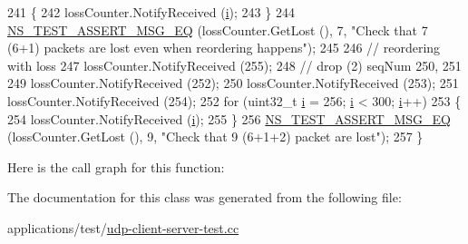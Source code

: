 \begin{DoxyCode}
241     \{
242       lossCounter.NotifyReceived (\hyperlink{bernuolliDistribution_8m_a6f6ccfcf58b31cb6412107d9d5281426}{i});
243     \}
244   \hyperlink{group__testing_ga2a9d78cffb3db8e867c35fff0b698cf5}{NS\_TEST\_ASSERT\_MSG\_EQ} (lossCounter.GetLost (), 7, \textcolor{stringliteral}{"Check that 7 (6+1) packets are
       lost even when reordering happens"});
245 
246   \textcolor{comment}{// reordering with loss}
247   lossCounter.NotifyReceived (255);
248   \textcolor{comment}{// drop (2) seqNum 250, 251}
249   lossCounter.NotifyReceived (252);
250   lossCounter.NotifyReceived (253);
251   lossCounter.NotifyReceived (254);
252   \textcolor{keywordflow}{for} (uint32\_t \hyperlink{bernuolliDistribution_8m_a6f6ccfcf58b31cb6412107d9d5281426}{i} = 256; \hyperlink{bernuolliDistribution_8m_a6f6ccfcf58b31cb6412107d9d5281426}{i} < 300; \hyperlink{bernuolliDistribution_8m_a6f6ccfcf58b31cb6412107d9d5281426}{i}++)
253     \{
254       lossCounter.NotifyReceived (\hyperlink{bernuolliDistribution_8m_a6f6ccfcf58b31cb6412107d9d5281426}{i});
255     \}
256   \hyperlink{group__testing_ga2a9d78cffb3db8e867c35fff0b698cf5}{NS\_TEST\_ASSERT\_MSG\_EQ} (lossCounter.GetLost (), 9, \textcolor{stringliteral}{"Check that 9 (6+1+2) packet are
       lost"});
257 \}
\end{DoxyCode}


Here is the call graph for this function\+:




The documentation for this class was generated from the following file\+:\begin{DoxyCompactItemize}
\item 
applications/test/\hyperlink{udp-client-server-test_8cc}{udp-\/client-\/server-\/test.\+cc}\end{DoxyCompactItemize}
